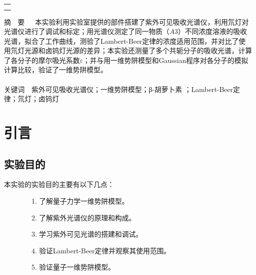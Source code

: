 \documentclass[12pt]{article}
\begin{document}
\begin{titlepage}
\begin{center}
\begin{tabular}{cp{5cm}}
            \end{tabular}
            \begin{tabular*}{\textwidth}{c}
                \\ %
                \\ %
                \\ %
                \hline %
            \end{tabular*}
        \end{center}
        \textsf{\textcolor{BrickRed}{摘\ \ 要}}\ \  \ 本实验利用实验室提供的部件搭建了紫外可见吸收光谱仪，利用氘灯对光谱仪进行了调试和标定；用光谱仪测定了同一物质（$A3$）不同浓度溶液的吸收光谱，拟合了工作曲线，测验了Lambert-Beer定律的浓度适用范围，并对比了使用氘灯光源和卤钨灯光源的差异；本实验还测量了多个共轭分子的吸收光谱，计算了各分子的摩尔吸光系数$\varepsilon$；并与用一维势阱模型和Gaussian程序对各分子的模拟计算比较，验证了一维势阱模型。
        \\
        \\
        \textsf{\textcolor{BrickRed}{关键词}}\ \ 紫外可见吸收光谱仪；一维势阱模型；β-胡萝卜素 ；Lambert-Beer定律；氘灯；卤钨灯
    \end{titlepage}

    \section{引言}
		\subsection{实验目的}
			本实验的实验目的主要有以下几点\citealp{physchemlab}：\par
			\ \ \ \ \ \ \ \ 1. 了解量子力学一维势阱模型。\par
			\ \ \ \ \ \ \ \	2. 了解紫外光谱仪的原理和构成。\par
			\ \ \ \ \ \ \ \	3. 学习紫外可见光谱的搭建和调试。\par
			\ \ \ \ \ \ \ \	4. 验证Lambert-Beer定律并观察其使用范围。\par
			\ \ \ \ \ \ \ \	5. 验证量子一维势阱模型。\par
		\par
\end{document}
